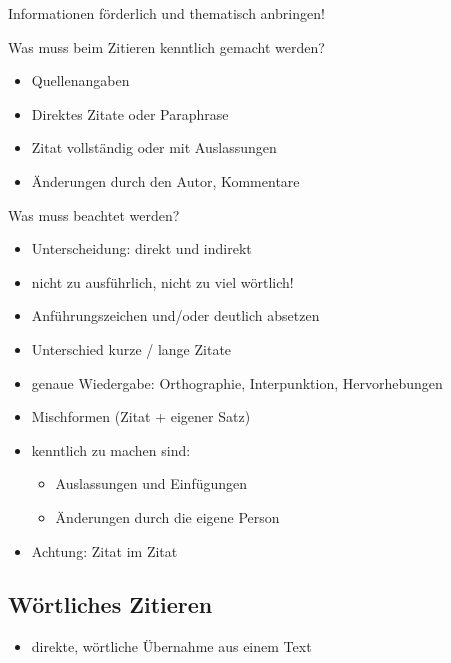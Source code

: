 \documentclass[ 12pt,
                titlepage,
                parskip=half,
                version=first,
                bibliography=totocnumbered,
                final,
                listof=totoc]{scrartcl}
\begin{document}
\begin{description}
    \item[Informationen förderlich und thematisch anbringen!]
\end{description}

\begin{description}
    \item[Was muss beim Zitieren kenntlich gemacht werden?]
\end{description}
\begin{itemize}
    \item Quellenangaben
    \item Direktes Zitate oder Paraphrase
    \item Zitat vollständig oder mit Auslassungen
    \item Änderungen durch den Autor, Kommentare
\end{itemize}

\begin{description}
    \item[Was muss beachtet werden?]
\end{description}
\begin{itemize}
    \item Unterscheidung: direkt und indirekt
    \item nicht zu ausführlich, nicht zu viel wörtlich!
    \item Anführungszeichen und/oder deutlich absetzen
    \item Unterschied kurze / lange Zitate
    \item genaue Wiedergabe: Orthographie, Interpunktion, Hervorhebungen
    \item Mischformen (Zitat + eigener Satz)
    \item kenntlich zu machen sind:
\begin{itemize}
    \item Auslassungen und Einfügungen
    \item Änderungen durch die eigene Person
\end{itemize}
    \item Achtung: Zitat im Zitat
\end{itemize}

\subsection{Wörtliches Zitieren}

\begin{itemize}
    \item direkte, wörtliche Übernahme aus einem Text
\end{itemize}
\end{document}
